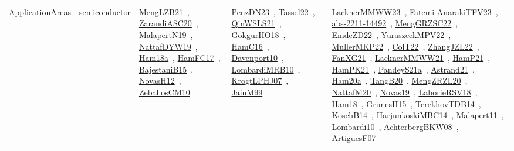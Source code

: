 {\begin{longtable}{lp{3cm}>{\raggedright\arraybackslash}p{6cm}>{\raggedright\arraybackslash}p{6cm}>{\raggedright\arraybackslash}p{8cm}}
\index{semiconductor}\index{ApplicationAreas!semiconductor}ApplicationAreas & semiconductor & \href{../works/MengLZB21.pdf}{MengLZB21}~\cite{MengLZB21}, \href{../works/ZarandiASC20.pdf}{ZarandiASC20}~\cite{ZarandiASC20}, \href{../works/MalapertN19.pdf}{MalapertN19}~\cite{MalapertN19}, \href{../works/NattafDYW19.pdf}{NattafDYW19}~\cite{NattafDYW19}, \href{../works/Ham18a.pdf}{Ham18a}~\cite{Ham18a}, \href{../works/HamFC17.pdf}{HamFC17}~\cite{HamFC17}, \href{../works/BajestaniB15.pdf}{BajestaniB15}~\cite{BajestaniB15}, \href{../works/NovasH12.pdf}{NovasH12}~\cite{NovasH12}, \href{../works/ZeballosCM10.pdf}{ZeballosCM10}~\cite{ZeballosCM10} & \href{../works/PenzDN23.pdf}{PenzDN23}~\cite{PenzDN23}, \href{../works/Tassel22.pdf}{Tassel22}~\cite{Tassel22}, \href{../works/QinWSLS21.pdf}{QinWSLS21}~\cite{QinWSLS21}, \href{../works/GokgurHO18.pdf}{GokgurHO18}~\cite{GokgurHO18}, \href{../works/HamC16.pdf}{HamC16}~\cite{HamC16}, \href{../works/Davenport10.pdf}{Davenport10}~\cite{Davenport10}, \href{../works/LombardiMRB10.pdf}{LombardiMRB10}~\cite{LombardiMRB10}, \href{../works/KrogtLPHJ07.pdf}{KrogtLPHJ07}~\cite{KrogtLPHJ07}, \href{../works/JainM99.pdf}{JainM99}~\cite{JainM99} & \href{../works/LacknerMMWW23.pdf}{LacknerMMWW23}~\cite{LacknerMMWW23}, \href{../works/Fatemi-AnarakiTFV23.pdf}{Fatemi-AnarakiTFV23}~\cite{Fatemi-AnarakiTFV23}, \href{../works/abs-2211-14492.pdf}{abs-2211-14492}~\cite{abs-2211-14492}, \href{../works/MengGRZSC22.pdf}{MengGRZSC22}~\cite{MengGRZSC22}, \href{../works/EmdeZD22.pdf}{EmdeZD22}~\cite{EmdeZD22}, \href{../works/YuraszeckMPV22.pdf}{YuraszeckMPV22}~\cite{YuraszeckMPV22}, \href{../works/MullerMKP22.pdf}{MullerMKP22}~\cite{MullerMKP22}, \href{../works/ColT22.pdf}{ColT22}~\cite{ColT22}, \href{../works/ZhangJZL22.pdf}{ZhangJZL22}~\cite{ZhangJZL22}, \href{../works/FanXG21.pdf}{FanXG21}~\cite{FanXG21}, \href{../works/LacknerMMWW21.pdf}{LacknerMMWW21}~\cite{LacknerMMWW21}, \href{../works/HamP21.pdf}{HamP21}~\cite{HamP21}, \href{../works/HamPK21.pdf}{HamPK21}~\cite{HamPK21}, \href{../works/PandeyS21a.pdf}{PandeyS21a}~\cite{PandeyS21a}, \href{../works/Astrand21.pdf}{Astrand21}~\cite{Astrand21}, \href{../works/Ham20a.pdf}{Ham20a}~\cite{Ham20a}, \href{../works/TangB20.pdf}{TangB20}~\cite{TangB20}, \href{../works/MengZRZL20.pdf}{MengZRZL20}~\cite{MengZRZL20}, \href{../works/NattafM20.pdf}{NattafM20}~\cite{NattafM20}, \href{../works/Novas19.pdf}{Novas19}~\cite{Novas19}, \href{../works/LaborieRSV18.pdf}{LaborieRSV18}~\cite{LaborieRSV18}, \href{../works/Ham18.pdf}{Ham18}~\cite{Ham18}, \href{../works/GrimesH15.pdf}{GrimesH15}~\cite{GrimesH15}, \href{../works/TerekhovTDB14.pdf}{TerekhovTDB14}~\cite{TerekhovTDB14}, \href{../works/KoschB14.pdf}{KoschB14}~\cite{KoschB14}, \href{../works/HarjunkoskiMBC14.pdf}{HarjunkoskiMBC14}~\cite{HarjunkoskiMBC14}, \href{../works/Malapert11.pdf}{Malapert11}~\cite{Malapert11}, \href{../works/Lombardi10.pdf}{Lombardi10}~\cite{Lombardi10}, \href{../works/AchterbergBKW08.pdf}{AchterbergBKW08}~\cite{AchterbergBKW08}, \href{../works/ArtiguesF07.pdf}{ArtiguesF07}~\cite{ArtiguesF07}\\

\end{longtable}}
